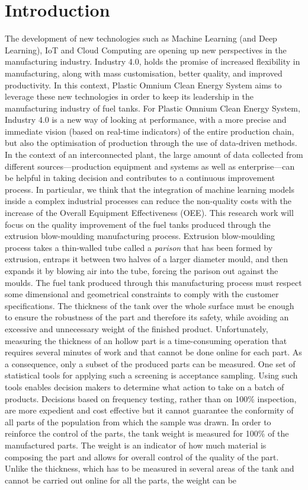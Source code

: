\chapter*{Introduction}
\thispagestyle{empty}


The development of new technologies such as Machine Learning (and Deep Learning), IoT and Cloud Computing are opening up new perspectives in the manufacturing industry. Industry 4.0, holds the promise of increased flexibility in manufacturing, along with mass customisation, better quality, and improved productivity. In this context, Plastic Omnium Clean Energy System aims to leverage these new technologies in order to keep its leadership in the manufacturing industry of fuel tanks. For Plastic Omnium Clean Energy System, Industry 4.0 is a new way of looking at performance, with a more precise and immediate vision (based on real-time indicators) of the entire production chain, but also the optimisation of production through the use of data-driven methods. In the context of an interconnected plant, the large amount of data collected from different sources—production equipment and systems as well as enterprise—can be helpful in taking decision and contributes to a continuous improvement process. In particular, we think that the integration of machine learning models inside a complex industrial processes can reduce the non-quality costs with the increase of the Overall Equipment Effectiveness (OEE). This research work will focus on the quality improvement of the fuel tanks produced through the extrusion blow-moulding manufacturing process. Extrusion blow-moulding process takes a thin-walled tube called a \textit{parison} that has been formed by extrusion, entraps it between two halves of a larger diameter mould, and then expands it by blowing air into the tube, forcing the parison out against the moulds. The fuel tank produced through this manufacturing process must respect some dimensional and geometrical constraints to comply with the customer specifications. The thickness of the tank over the whole surface must be enough to ensure the robustness of the part and therefore its safety, while avoiding an excessive and unnecessary weight of the finished product. Unfortunately, measuring the thickness of an hollow part is a time-consuming operation that requires several minutes of work and that cannot be done online for each part. As a consequence, only a subset of the produced parts can be measured. One set of statistical tools for applying such a screening is acceptance sampling. Using such tools enables decision makers to determine what action to take on a batch of products. Decisions based on frequency testing, rather than on 100\% inspection, are more expedient and cost effective but it cannot guarantee the conformity of all parts of the population from which the sample was drawn. In order to reinforce the control of the parts, the tank weight is measured for 100\% of the manufactured parts. The weight is an indicator of how much material is composing the part and allows for overall control of the quality of the part. Unlike the thickness, which has to be measured in several areas of the tank and cannot be carried out online for all the parts, the weight can be 